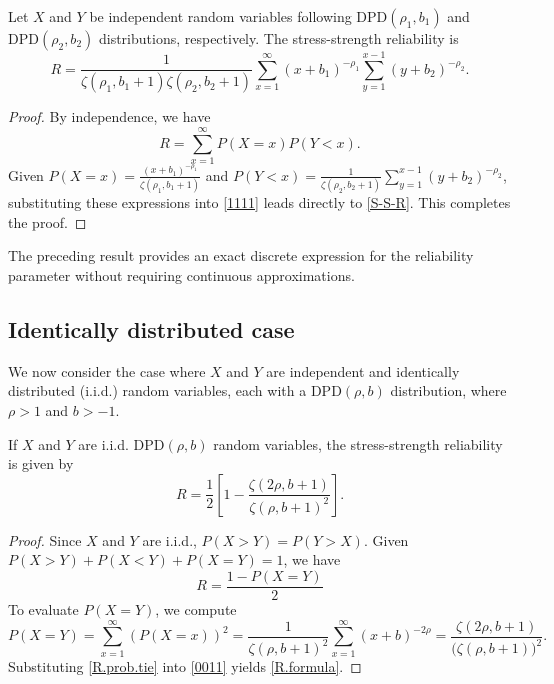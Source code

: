 \documentclass[twoside]{article}
\begin{document}
\begin{thm} 
Let $X$ and $Y$ be independent random variables following $\mathrm{DPD}(\rho_1, b_1)$ and $\mathrm{DPD}(\rho_2, b_2)$ distributions, respectively. The stress-strength reliability is
\begin{equation}\label{S-S-R} 
R = \frac{1}{\zeta(\rho_1, b_1+1)\zeta(\rho_2, b_2+1)} \sum_{x=1}^{\infty} (x+b_1)^{-\rho_1} \sum_{y=1}^{x-1} (y+b_2)^{-\rho_2}. 
\end{equation}
\end{thm} 

\begin{proof} 
By independence, we have  
\begin{equation}\label{1111} 
R = \sum_{x=1}^{\infty} P(X=x) P(Y < x).
\end{equation}
Given $P(X=x) = \frac{(x+b_1)^{-\rho_1}}{\zeta(\rho_1, b_1+1)}$ and $P(Y < x) = \frac{1}{\zeta(\rho_2, b_2+1)} \sum_{y=1}^{x-1} (y+b_2)^{-\rho_2}$, substituting these expressions into  \eqref{1111}  leads directly to \eqref{S-S-R}. This completes the proof. 
\end{proof}


The preceding result provides an exact discrete expression for the reliability parameter without requiring continuous approximations. 

\subsection{Identically distributed case}
We now consider the case where $X$ and $Y$ are independent and identically distributed (i.i.d.) random variables, each with a $\mathrm{DPD}(\rho,b)$ distribution, where $\rho>1$ and $b>-1$.  

\begin{thm}\label{thm:i.i.d} 
If $X$ and $Y$ are i.i.d. $\mathrm{DPD}(\rho,b)$ random variables, the stress-strength reliability is given by  
\begin{equation}\label{R.formula} 
R = \frac{1}{2} \left[ 1 - \frac{\zeta(2\rho, b+1)}{\zeta(\rho, b+1)^2} \right]. 
\end{equation}
\end{thm}
 

\begin{proof} 
Since $X$ and $Y$ are i.i.d., $P(X>Y) = P(Y>X)$. Given $P(X>Y) + P(X<Y) + P(X=Y) = 1$, we have 
\begin{equation}\label{0011} 
R = \frac{1 - P(X=Y)}{2}
\end{equation} 
To evaluate $P(X=Y)$, we compute 
\begin{equation}\label{R.prob.tie} 
P(X=Y) = \sum_{x=1}^{\infty} \left(P(X=x)\right)^2 = \frac{1}{\zeta(\rho, b+1)^2} \sum_{x=1}^{\infty} (x+b)^{-2\rho} = \frac{\zeta(2\rho, b+1)}{\big(\zeta(\rho, b+1)\big)^2}. 
\end{equation}
Substituting  \eqref{R.prob.tie}  into  \eqref{0011}   yields \eqref{R.formula}. 
\end{proof}
\end{document}
